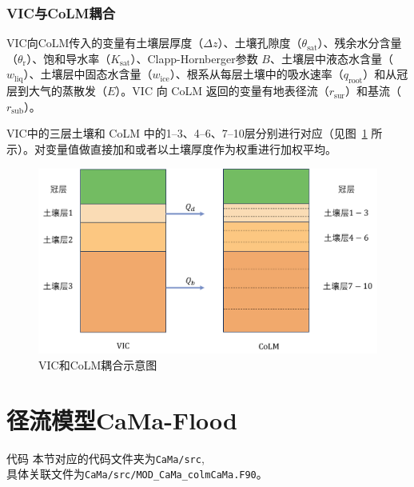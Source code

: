 \subsubsection{VIC与CoLM耦合} %

    VIC向CoLM传入的变量有土壤层厚度（$\Delta z$）、土壤孔隙度（$\theta_{\text{sat}}$）、残余水分含量（$\theta_\text{r}$）、饱和导水率（$K_{\text{sat}}$）、Clapp-Hornberger参数 $B$、土壤层中液态水含量（$w_{\text{liq}}$）、土壤层中固态水含量（$w_{\text{ice}}$）、根系从每层土壤中的吸水速率（$q_{\text{root}}$）和从冠层到大气的蒸散发（$E$）。VIC 向 CoLM 返回的变量有地表径流（$r_{\text{sur}}$）和基流（$r_{\text{sub}}$）。

    VIC中的三层土壤和 CoLM 中的1--3、4--6、7--10层分别进行对应（见图~\ref{fig:VIC和CoLM耦合示意图} 所示）。对变量值做直接加和或者以土壤厚度作为权重进行加权平均。

    {
      \begin{figure}[htbp]
        \centering
        \includegraphics[width=\textwidth]{Figures/陆地表面的水分循环/VIC说明图中文.pdf}
        \caption{VIC和CoLM耦合示意图}
        \label{fig:VIC和CoLM耦合示意图}
      \end{figure}
    }


\section{径流模型CaMa-Flood}
\begin{mymdframed}{代码}
  本节对应的代码文件夹为\texttt{CaMa/src},\\具体关联文件为\texttt{CaMa/src/MOD\_CaMa\_colmCaMa.F90}。
\end{mymdframed}

